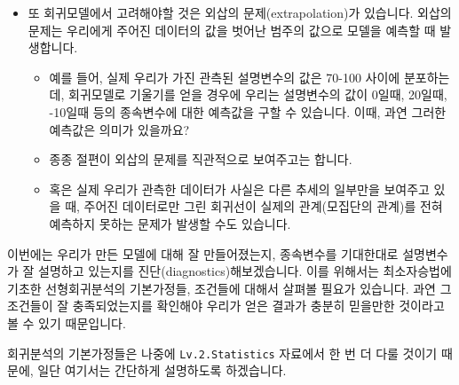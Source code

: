 \documentclass[]{book}
\providecommand{\tightlist}{%
  \setlength{\itemsep}{0pt}\setlength{\parskip}{0pt}}
\begin{document}
\begin{itemize}
\item
  또 회귀모델에서 고려해야할 것은 외삽의 문제(extrapolation)가 있습니다. 외삽의 문제는 우리에게 주어진 데이터의 값을 벗어난 범주의 값으로 모델을 예측할 때 발생합니다.

  \begin{itemize}
  \tightlist
  \item
    예를 들어, 실제 우리가 가진 관측된 설명변수의 값은 70-100 사이에 분포하는데, 회귀모델로 기울기를 얻을 경우에 우리는 설명변수의 값이 0일때, 20일때, -10일때 등의 종속변수에 대한 예측값을 구할 수 있습니다. 이때, 과연 그러한 예측값은 의미가 있을까요?
  \item
    종종 절편이 외삽의 문제를 직관적으로 보여주고는 합니다.
  \item
    혹은 실제 우리가 관측한 데이터가 사실은 다른 추세의 일부만을 보여주고 있을 때, 주어진 데이터로만 그린 회귀선이 실제의 관계(모집단의 관계)를 전혀 예측하지 못하는 문제가 발생할 수도 있습니다.
  \end{itemize}
\end{itemize}

이번에는 우리가 만든 모델에 대해 잘 만들어졌는지, 종속변수를 기대한대로 설명변수가 잘 설명하고 있는지를 진단(diagnostics)해보겠습니다. 이를 위해서는 최소자승법에 기초한 선형회귀분석의 기본가정들, 조건들에 대해서 살펴볼 필요가 있습니다. 과연 그 조건들이 잘 충족되었는지를 확인해야 우리가 얻은 결과가 충분히 믿을만한 것이라고 볼 수 있기 때문입니다.

회귀분석의 기본가정들은 나중에 \texttt{Lv.2.Statistics} 자료에서 한 번 더 다룰 것이기 때문에, 일단 여기서는 간단하게 설명하도록 하겠습니다.
\end{document}
